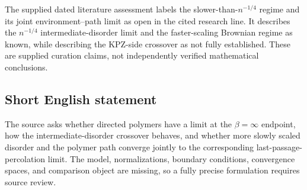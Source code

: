 \documentclass[11pt]{article}
\begin{document}
The supplied dated literature assessment labels the slower-than-$n^{-1/4}$ regime and its joint environment--path limit as open in the cited research line. It describes the $n^{-1/4}$ intermediate-disorder limit and the faster-scaling Brownian regime as known, while describing the KPZ-side crossover as not fully established. These are supplied curation claims, not independently verified mathematical conclusions.
\subsection{Short English statement}
The source asks whether directed polymers have a limit at the $\beta=\infty$ endpoint, how the intermediate-disorder crossover behaves, and whether more slowly scaled disorder and the polymer path converge jointly to the corresponding last-passage-percolation limit. The model, normalizations, boundary conditions, convergence spaces, and comparison object are missing, so a fully precise formulation requires source review.
\end{document}
